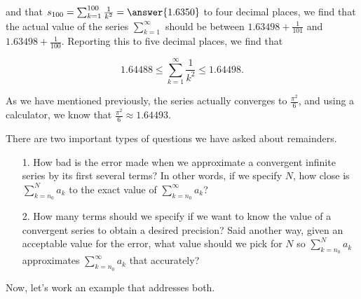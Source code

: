 \documentclass{ximera}
\begin{document}
\begin{model}
and that $s_{100} = \sum_{k=1}^{100} \frac{1}{k^2} = \answer{1.6350}$ to four decimal places, we find that the actual value of the series $\sum_{k=1}^{\infty}$ should be between $1.63498 + \frac{1}{101}$ and $1.63498 + \frac{1}{100}$.  Reporting this to five decimal places, we find that

\[
1.64488 \leq \sum_{k=1}^{\infty} \frac{1}{k^2} \leq 1.64498. 
\]

As we have mentioned previously, the series actually converges to $\frac{\pi^2}{6}$, and using a calculator, we know that $\frac{\pi^2}{6} \approx 1.64493$.  

\end{model}

There are two important types of questions we have asked about remainders.

\begin{itemize}
\item[1.] How bad is the error made when we approximate a convergent infinite series by its first several terms?
In other words, if we specify $N$, how close is $\sum_{k=n_0}^{N} a_k$ to the exact value of $\sum_{k=n_0}^{\infty} a_k$?
\item[2.] How many terms should we specify if we want to know the value of a convergent series to obtain a desired precision?
Said another way, given an acceptable value for the error, what value should we pick for $N$ so $\sum_{k=n_0}^{N} a_k$ approximates $\sum_{k=n_0}^{\infty} a_k$ that accurately?
\end{itemize}

Now, let's work an example that addresses both.
\end{document}
